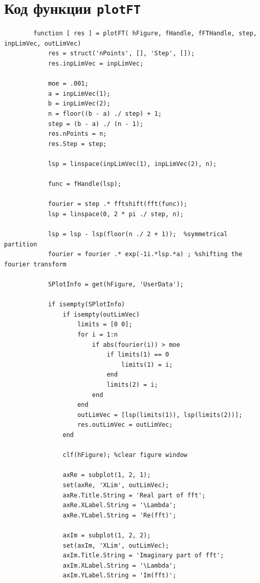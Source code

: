 \documentclass[11pt, oneside, draft]{article}
\numberwithin{equation}{section}
\begin{document}
    \section{Код функции \texttt{plotFT}} %
    \label{app:code}
    \begin{verbatim}
        function [ res ] = plotFT( hFigure, fHandle, fFTHandle, step, inpLimVec, outLimVec)
            res = struct('nPoints', [], 'Step', []);
            res.inpLimVec = inpLimVec;
        
            moe = .001;
            a = inpLimVec(1);
            b = inpLimVec(2);
            n = floor((b - a) ./ step) + 1;
            step = (b - a) ./ (n - 1);
            res.nPoints = n;
            res.Step = step;
        
            lsp = linspace(inpLimVec(1), inpLimVec(2), n);

            func = fHandle(lsp);
        
            fourier = step .* fftshift(fft(func));
            lsp = linspace(0, 2 * pi ./ step, n);
        
            lsp = lsp - lsp(floor(n ./ 2 + 1));  %symmetrical partition
            fourier = fourier .* exp(-1i.*lsp.*a) ; %shifting the fourier transform
        
            SPlotInfo = get(hFigure, 'UserData');
        
            if isempty(SPlotInfo)
                if isempty(outLimVec)
                    limits = [0 0];
                    for i = 1:n
                        if abs(fourier(i)) > moe
                            if limits(1) == 0
                                limits(1) = i;
                            end
                            limits(2) = i;
                        end
                    end
                    outLimVec = [lsp(limits(1)), lsp(limits(2))];
                    res.outLimVec = outLimVec;
                end
            
                clf(hFigure); %clear figure window
            
                axRe = subplot(1, 2, 1);
                set(axRe, 'XLim', outLimVec);
                axRe.Title.String = 'Real part of fft';
                axRe.XLabel.String = '\Lambda';
                axRe.YLabel.String = 'Re(fft)';
            
                axIm = subplot(1, 2, 2);
                set(axIm, 'XLim', outLimVec);
                axIm.Title.String = 'Imaginary part of fft';
                axIm.XLabel.String = '\Lambda';
                axIm.YLabel.String = 'Im(fft)';
           

\end{verbatim}
\end{document}
